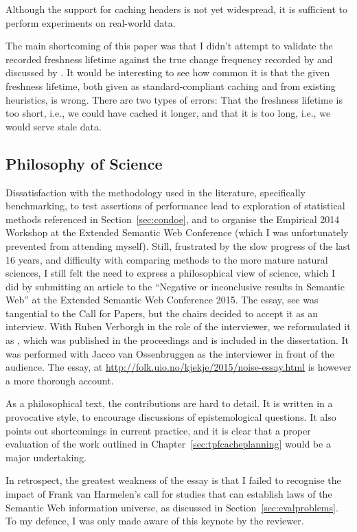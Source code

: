 Although the support for caching headers is not yet widespread, it is
sufficient to perform experiments on real-world data.

The main shortcoming of this paper was that I didn't attempt to
validate the recorded freshness lifetime against the true change
frequency recorded by \cite{dyldo2} and discussed by
\cite{Dividino2015}. It would be interesting to see how common it is
that the given freshness lifetime, both given as standard-compliant
caching and from existing heuristics, is wrong. There are two types of
errors: That the freshness lifetime is too short, i.e., we could have
cached it longer, and that it is too long, i.e., we would serve stale
data.

\subsection{Philosophy of Science}\label{sec:conphil}

Dissatisfaction with the methodology used in the literature,
specifically benchmarking, to test assertions of performance lead to
exploration of statistical methods referenced in
Section~\ref{sec:condoe}, and to organise the Empirical 2014 Workshop
at the Extended Semantic Web Conference (which I was unfortunately
prevented from attending myself). Still, frustrated by the slow
progress of the last 16 years, and difficulty with comparing methods
to the more mature natural sciences, I still felt the need to express
a philosophical view of science, which I did by submitting an article
to the ``Negative or inconclusive results in Semantic Web'' at the
Extended Semantic Web Conference 2015. The essay, see
\cite{kjernsmo_noise_2015} was tangential to the Call for Papers, but
the chairs decided to accept it as an interview. With Ruben Verborgh
in the role of the interviewer, we reformulated it as
\cite{kjernsmo_noise_2015_interview}, which was published in the
proceedings and is included in the dissertation. It was performed with
Jacco van Ossenbruggen as the interviewer in front of the
audience. The essay, at
\url{http://folk.uio.no/kjekje/2015/noise-essay.html} is however a
more thorough account.

As a philosophical text, the contributions are hard to detail. It is
written in a provocative style, to encourage discussions of
epistemological questions. It also points out shortcomings in current
practice, and it is clear that a proper evaluation of the work
outlined in Chapter~\ref{sec:tpfcacheplanning} would be a major
undertaking. 

In retrospect, the greatest weakness of the essay is that I failed to
recognise the impact of Frank van Harmelen's call for studies that can
establish laws of the Semantic Web information universe, as discussed
in Section~\ref{sec:evalproblems}. To my defence, I was only made
aware of this keynote by the reviewer.
